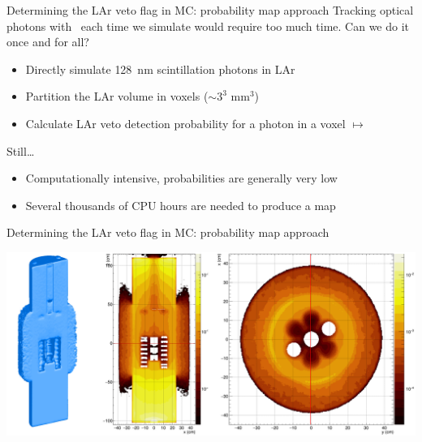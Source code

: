 \documentclass[10pt,aspectratio=169]{beamer}
\newcommand{\arrow}{$\longmapsto$}
\begin{document}
\begin{frame}{Determining the LAr veto flag in MC: probability map approach}
  Tracking optical photons with \geant\ each time we simulate would require too
  much time. Can we do it once and for all?
  \begin{itemize}
    \item Directly simulate \alert{128~nm} scintillation photons in LAr
    \item Partition the LAr volume in \alert{voxels} ($\sim3^3$ mm$^3$)
    \item Calculate LAr veto \alert{detection probability} for a photon in a voxel
      \arrow\ 
  \end{itemize}
  Still\ldots
  \begin{itemize}
    \item Computationally intensive, probabilities are generally very low
    \item Several thousands of CPU hours are needed to produce a map
  \end{itemize}
\end{frame}
\begin{frame}{Determining the LAr veto flag in MC: probability map approach}
  \begin{center}
    \includegraphics[width=\textwidth]{plots/bkg/lar/ph2/larmodel/larmap-tac.png}
  \end{center}
\end{frame}
\end{document}
